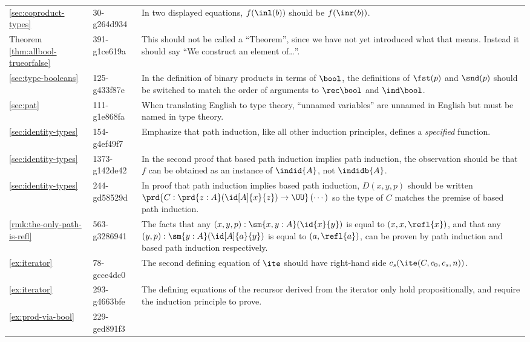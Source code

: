\documentclass[
%
%
11pt %
]{article}
\begin{document}
\begin{longtable}{llp{10.5cm}}
  \cref{sec:coproduct-types}
  & 30-g264d934
  & In two displayed equations, $f(\inl(b))$ should be $f(\inr(b))$.\\
  Theorem \ref{thm:allbool-trueorfalse} %
  & 391-g1ce619a
  & This should not be called a ``Theorem'', since we have not yet introduced what that means.
  Instead it should say ``We construct an element of\dots''.\\
  \cref{sec:type-booleans}
  & 125-g433f87e
  & In the definition of binary products in terms of $\bool$, the definitions of $\fst(p)$ and $\snd(p)$ should be switched to match the order of arguments to $\rec\bool$ and $\ind\bool$.\\
  \cref{sec:pat}
  & 111-g1e868fa
  & When translating English to type theory, ``unnamed variables'' are unnamed in English but must be named in type theory.\\
  \cref{sec:identity-types}
  & 154-g4ef49f7
  & Emphasize that path induction, like all other induction principles, defines a \emph{specified} function.\\
  \cref{sec:identity-types}
  & 1373-g142de42
  & In the second proof that based path induction implies path induction, the observation should be that $f$ can be obtained as an instance of $\indid{A}$, not $\indidb{A}$.\\
  \cref{sec:identity-types}
  & 244-gd58529d
  & In proof that path induction implies based path induction, $D(x,y,p)$ should be written $\prd{C : \prd{z:A} (\id[A]{x}{z}) \to \UU} \left( \cdots \right)$ so the type of $C$ matches the premise of based path induction. \\
  \cref{rmk:the-only-path-is-refl}
  & 563-g3286941
  & The facts that any $(x,y,p): \sm{x,y:A}(\id{x}{y})$ is equal to $(x,x,\refl{x})$, and that any $(y,p):\sm{y:A}(\id[A]{a}{y})$ is equal to $(a,\refl{a})$, can be proven by path induction and based path induction respectively.\\
  \cref{ex:iterator}
  & 78-gcce4dc0
  & The second defining equation of $\ite$ should have right-hand side $c_s(\ite(C,c_0,c_s,n))$.\\
  \cref{ex:iterator}
  & 293-g4663bfe
  & The defining equations of the recursor derived from the iterator only hold propositionally, and require the induction principle to prove.\\
  \cref{ex:prod-via-bool}
  & 229-ged891f3

\end{longtable}
\end{document}
